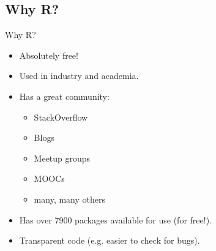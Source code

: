\subsection{Why R?}
\begin{frame}
	\begin{center}
  		\begin{block}{Why R?} 
			\begin{itemize}
				\item Absolutely free!
				\item Used in industry and academia.
				\item Has a great community:
					\begin{itemize}
						\item StackOverflow
						\item Blogs
						\item Meetup groups
						\item MOOCs
						\item many, many others
					\end{itemize}
				\item Has over 7900 packages available for use (for free!).
				\item Transparent code (e.g. easier to check for bugs).
			\end{itemize}
		\end{block}
	\end{center} 
\end{frame}




